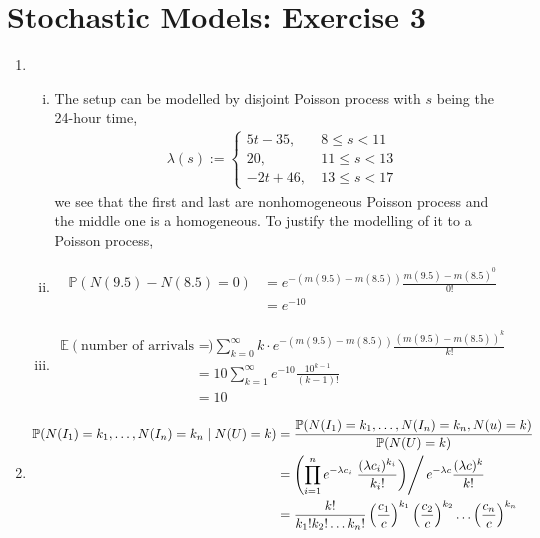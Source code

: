 \documentclass[a4paper,10pt]{article}
\theoremstyle{definition}
\begin{document}
\section*{Stochastic Models: Exercise 3}

\begin{enumerate}
\item
\begin{enumerate}[(i)]
\item 
The setup can be modelled by disjoint Poisson process with $s$ being the 24-hour time,
\begin{align*}
\lambda(s):=\begin{cases}
5t-35, &~8\leq s < 11\\
20, &~11\leq s < 13\\
-2t+46, &~13\leq s < 17
\end{cases}
\end{align*}
we see that the first and last are nonhomogeneous Poisson process and the middle one is a homogeneous.  To justify the modelling of it to a Poisson process, 
\item 
\begin{align*}
\mathbb{P}(N(9.5)-N(8.5)=0)&=e^{-(m(9.5)-m(8.5))}\frac{m(9.5)-m(8.5)^0}{0!}\\
&=e^{-10}
\end{align*}
\item 
\begin{align*}
\mathbb{E}(\text{number of arrivals from 8:30AM-9:30AM})&=\sum_{k=0}^{\infty}k\cdot e^{-(m(9.5)-m(8.5))}\frac{(m(9.5)-m(8.5))^k}{k!}\\
&=10\sum_{k=1}^{\infty} e^{-10}\frac{10^{k-1}}{(k-1)!}\\
&=10
\end{align*}
\end{enumerate}
\item 
\begin{align*}
\mathbb{P}(N(I_1)=k_1,\ldots,N(I_n)=k_n\mid N(U)=k)&=\frac{\mathbb{P}(N(I_1)=k_1,\ldots,N(I_n)=k_n,N(u)=k)}{\mathbb{P}(N(U)=k)}\\
&=\left(\prod_{i=1}^{n}e^{-\lambda c_i}\left.\frac{(\lambda c_i)^{k_i}}{k_i!}\right)\right/ e^{-\lambda c}\frac{(\lambda c)^k}{k!}\\
&=\frac{k!}{k_1!k_2!\ldots k_n!}\left(\frac{c_1}{c}\right)^{k_1}\left(\frac{c_2}{c}\right)^{k_2}\ldots\left(\frac{c_n}{c}\right)^{k_n}
\end{align*}


\end{enumerate}
\end{document}
